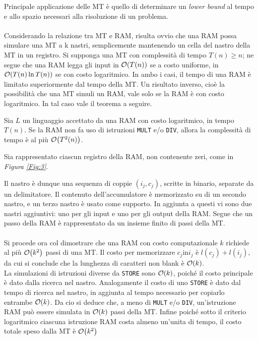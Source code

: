 \documentclass{article}
\begin{document}
Principale applicazione delle MT è quello di determinare un \emph{lower bound} al tempo e allo spazio necessari alla risoluzione di un problema.
\\ \\
Considerando la relazione tra MT e RAM, risulta ovvio che una RAM possa simulare una MT a k nastri, semplicemente mantenendo un cella del nastro della MT in un registro.
Si supponga una MT con complessità di tempo \(T(n) \ge n\); ne segue che una RAM legga gli input in \(\order{T(n)}\) se a costo uniforme,
in \(\order{T(n) \ln T(n)}\) se con costo logaritmico. In ambo i casi, il tempo di una RAM è limitato superiormente dal tempo della MT.
Un risultato inverso, cioè la possibilità che una MT simuli un RAM, vale solo se la RAM è con costo logaritmico.
In tal caso vale il teorema a seguire.

\begin{Theorem}
    Sia \(L\) un linguaggio accettato da una RAM con costo logaritmico, in tempo \(T(n)\).
    Se la RAM non fa uso di istruzioni \lstinline[language = RAM]{MULT} e/o \lstinline[language = RAM]{DIV}, allora la complessità di tempo è al più \(\order{T^{2}(n)}\).
\end{Theorem}

\begin{Proof*}
    Sia rappresentato ciascun registro della RAM, non contenente zeri, come in \emph{Figura \ref{Fig:3}}.
    

    \noindent Il nastro è dunque una sequenza di coppie \((i_{j}, c_{j})\), scritte in binario, separate da un delimitatore.
    Il contenuto dell'accumulatore è memorizzato su di un secondo nastro, e un terzo nastro è usato come supporto.
    In aggiunta a questi vi sono due nastri aggiuntivi: uno per gli input e uno per gli output della RAM.
    Segue che un passo della RAM è rappresentato da un insieme finito di passi della MT.
    \\ \\
    Si procede ora col dimostrare che una RAM con costo computazionale \(k\) richiede al più \(\order{k^{2}}\) passi di una MT.
    Il costo per memorizzare \(c_{j} \text{in} i_{j}\) è \(l(c_{j}) + l(i_{j})\), da cui si conclude che la lunghezza di caratteri non blank è \(\order{k}\).
    \\
    La simulazioni di istruzioni diverse da \lstinline[language = RAM]{STORE} sono \(\order{k}\), poiché il costo principale è dato dalla ricerca nel nastro.
    Analogamente il costo di uno \lstinline[language = RAM]{STORE} è dato dal tempo di ricerca nel nastro, in aggiunta al tempo necessario per copiarlo entrambe \(\order{k}\).
    Da cio si deduce che, a meno di \lstinline[language = RAM]{MULT} e/o \lstinline[language = RAM]{DIV}, un'istruzione RAM può essere simulata in \(\order{k}\) passi della MT.
    Infine poiché sotto il criterio logaritmico ciascuna istruzione RAM costa almeno un'unita di tempo, il costo totale speso dalla MT è \(\order{k^{2}}\)
\end{Proof*}
\end{document}
